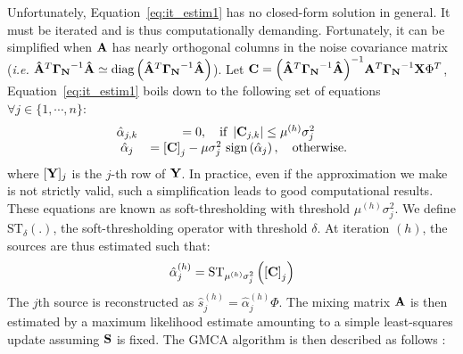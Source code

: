 Unfortunately, Equation~\ref{eq:it_estim1} has no closed-form solution in general. It must be iterated and is thus computationally demanding. 
Fortunately, it can be simplified when ${\bf A}$ has nearly orthogonal columns in the noise covariance matrix (\textit{i.e.} 
${\bf \hat{A}}^T{\bf \Gamma_N}^{-1}{\bf \hat{A}} \simeq \mbox{diag}\left({\bf \hat{A}}^T{\bf \Gamma_N}^{-1}{\bf \hat{A}}\right)$). 
Let ${\bf C} = {\left({\bf \hat{A}}^T{\bf \Gamma_N}^{-1}{\bf \hat{A}}\right)}^{-1}{\bf A}^T{\bf \Gamma_N}^{-1}{\bf X}\Phi^T$, Equation~\ref{eq:it_estim1} 
boils down to the following set of equations $\forall j\in\{1,\cdots,n\}$:
\begin{equation}
\label{eq:it_estim}
\begin{array}{ccc}
\hat{\alpha}_{j,k} & = 0, \quad \text{if} ~ \left|{{\bf C}}_{j,k} \right| \leq \mu^{(h)} \sigma_j^2 \\
\hat{\alpha}_j & = {\left[{\bf C}\right]}_j - \mu \sigma_j^2  \mbox{ sign}\left(\hat{\alpha}_j\right), \quad \text{otherwise}.
\end{array}
\end{equation}
where $[{\bf Y}]_j$ is the $j$-th row of ${\bf Y}$. In practice, even if the approximation we make is not strictly valid, such a simplification 
leads to good computational results. These equations are known as soft-thresholding with threshold $\mu^{(h)} \sigma_j^2$. We define $\mathrm{ST}_{\delta}(.)$, 
the soft-thresholding operator with threshold $\delta$. At iteration $(h)$, the sources are thus estimated such that:
\begin{equation}
\hat{\alpha}_j^{(h)} = \mathrm{ST}_{\mu^{(h)} \sigma_j^2}\left(\left[{\bf C}\right]_j\right)
\end{equation}
The $j$th source is reconstructed as $\hat{s}_j^{(h)} = \hat{\alpha}_j^{(h)}\Phi$. The mixing matrix ${\bf A}$ is then estimated by a maximum 
likelihood estimate amounting to a simple least-squares update assuming ${\bf S}$ is fixed. The GMCA algorithm is then described as follows :
